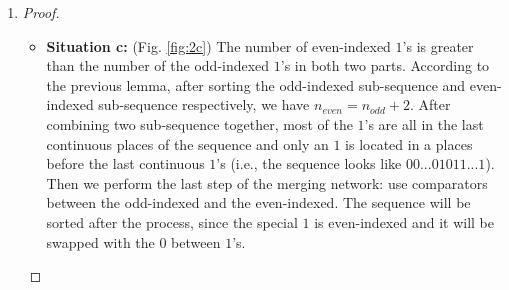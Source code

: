 \documentclass[12pt,a4paper]{article}
\makeatletter
\newtheorem*{solution}{Solution}
\theoremstyle{definition}
\renewenvironment{solution}[1][Solution] {\par\pushQED{\qed}\normalfont\topsep6\p@\@plus6\p@\relax\trivlist\item[\hskip\labelsep\bfseries#1\@addpunct{.}]\ignorespaces}{\popQED\endtrivlist\@endpefalse} \makeatother
\makeatother
\begin{document}
\begin{enumerate}
\begin{solution}
\begin{enumerate}
\begin{proof}
\begin{itemize}
\begin{itemize}
            \item \textbf{Situation c:} (Fig. \ref{fig:2c}) The number of even-indexed $1$'s is greater than the number of the odd-indexed $1$'s in both two parts. According to the previous lemma, after sorting the odd-indexed sub-sequence and even-indexed sub-sequence respectively, we have $n_{even} = n_{odd} + 2$. After combining two sub-sequence together, most of the $1$'s are all in the last continuous places of the sequence and only an $1$ is located in a places before the last continuous $1$'s (i.e., the sequence looks like $00...01011...1$). Then we perform the last step of the merging network: use comparators between the odd-indexed and the even-indexed. The sequence will be sorted after the process, since the special $1$ is even-indexed and it will be swapped with the $0$ between $1$'s.
            \end{itemize}
            \begin{figure}[h]
                \centering
\end{figure}
\end{itemize}
\end{proof}
\end{enumerate}
\end{solution}
\end{enumerate}
\end{document}
